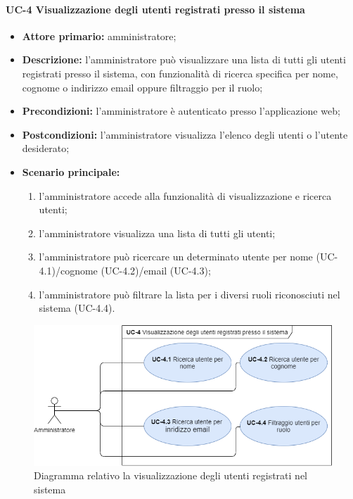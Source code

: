 
\paragraph{UC-4 Visualizzazione degli utenti registrati presso il sistema}

\begin{itemize}
	\item \textbf{Attore primario:} amministratore; 

	\item \textbf{Descrizione:} l'amministratore può visualizzare una lista di tutti gli utenti registrati presso il sistema, con funzionalità di ricerca specifica per nome, cognome o indirizzo email oppure filtraggio per il ruolo;

	\item \textbf{Precondizioni:} l'amministratore è autenticato presso l'applicazione web;

	\item \textbf{Postcondizioni:} l'amministratore visualizza l'elenco degli utenti o l'utente desiderato;

	\item \textbf{Scenario principale:}
	      \begin{enumerate}
		      \item l'amministratore accede alla funzionalità di visualizzazione e ricerca utenti;
		      \item l'amministratore visualizza una lista di tutti gli utenti;
		      \item l'amministratore può ricercare un determinato utente per nome (UC-4.1)/cognome (UC-4.2)/email (UC-4.3);
		      \item l'amministratore può filtrare la lista per i diversi ruoli riconosciuti nel sistema (UC-4.4).
	      \end{enumerate}
\end{itemize}
\begin{figure}[H]
    \centering
      \includegraphics[scale=0.40]{src/CasiDUso/immagini/VisualizzazioneUtenti.png}
    \caption{Diagramma relativo la visualizzazione degli utenti registrati nel sistema}
\end{figure}

